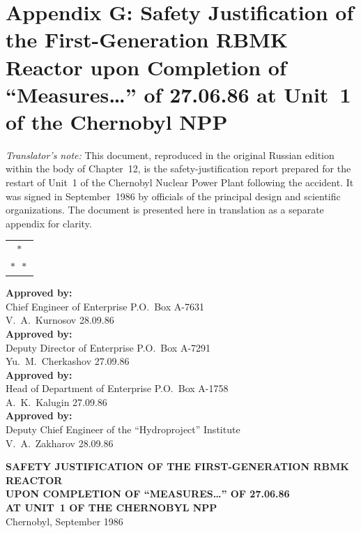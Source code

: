 \documentclass[openright]{bookest}
\newcommand{\varthreestars}{\begin{center}\begin{tabular}{c}$\ast$\\[-0.8ex] $\ast\enspace \ast $\end{tabular}\end{center}}
\begin{document}
\chapter*{Appendix G: Safety Justification of the First-Generation RBMK Reactor upon Completion of ``Measures\ldots'' of 27.06.86 at Unit~1 of the Chernobyl NPP}

\textit{Translator's note:} This document, reproduced in the original Russian edition within the body of Chapter~12, is the safety-justification report prepared for the restart of Unit~1 of the Chernobyl Nuclear Power Plant following the accident. It was signed in September~1986 by officials of the principal design and scientific organizations. The document is presented here in translation as a separate appendix for clarity.

\varthreestars

\begin{flushright}\small{
\textbf{Approved by:}\\
Chief Engineer of Enterprise P.O.~Box A-7631\\
V.~A.~Kurnosov \hfill 28.09.86\\[0.5\baselineskip]
\textbf{Approved by:}\\
Deputy Director of Enterprise P.O.~Box A-7291\\
Yu.~M.~Cherkashov \hfill 27.09.86\\[0.5\baselineskip]
\textbf{Approved by:}\\
Head of Department of Enterprise P.O.~Box A-1758\\
A.~K.~Kalugin \hfill 27.09.86\\[0.5\baselineskip]
\textbf{Approved by:}\\
Deputy Chief Engineer of the ``Hydroproject'' Institute\\
V.~A.~Zakharov \hfill 28.09.86
}\end{flushright}

\begin{center}
\textbf{SAFETY JUSTIFICATION OF THE FIRST-GENERATION RBMK REACTOR\\
UPON COMPLETION OF ``MEASURES\ldots'' OF 27.06.86\\
AT UNIT~1 OF THE CHERNOBYL NPP}\\[0.5\baselineskip]
Chernobyl, September 1986
\end{center}
\end{document}
